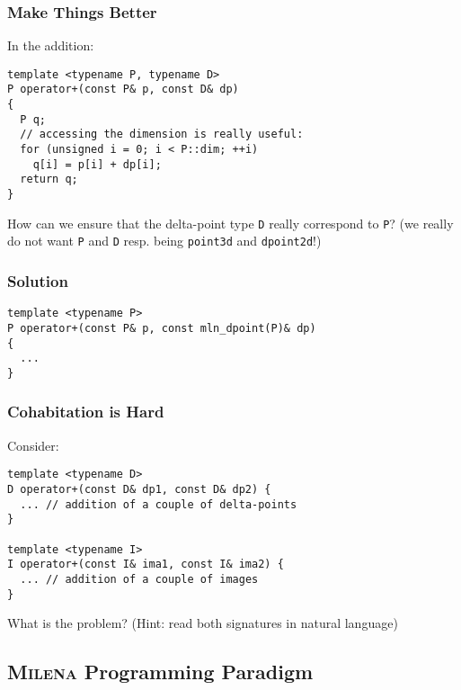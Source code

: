 \documentclass{beamer}
\newcommand{\code}[1]{{\scriptsize{\texttt{#1}}}\xspace}
\newcommand{\mln}{\textsc{Milena}\xspace}
\begin{document}
\begin{frame}[fragile]
  \frametitle{Make Things Better}

In the addition:

\begin{lstlisting}
template <typename P, typename D>
P operator+(const P& p, const D& dp)
{
  P q;
  // accessing the dimension is really useful:
  for (unsigned i = 0; i < P::dim; ++i)
    q[i] = p[i] + dp[i];
  return q;
}
\end{lstlisting}

How can we ensure that the delta-point type \code{D} really correspond
to \code{P}?  {\scriptsize (we really do not want \code{P} and
  \code{D} resp. being \code{point3d} and \code{dpoint2d}!)}

\end{frame}


\begin{frame}[fragile]
  \frametitle{Solution}

\begin{lstlisting}
template <typename P>
P operator+(const P& p, const mln_dpoint(P)& dp)
{
  ...
}
\end{lstlisting}

\end{frame}



\begin{frame}[fragile]
  \frametitle{Cohabitation is Hard}

Consider:

\begin{lstlisting}
template <typename D>
D operator+(const D& dp1, const D& dp2) {
  ... // addition of a couple of delta-points
}

template <typename I>
I operator+(const I& ima1, const I& ima2) {
  ... // addition of a couple of images
}
\end{lstlisting}

What is the problem?  (Hint: read both signatures in natural language)

\end{frame}



\subsection{\mln Programming Paradigm}
\end{document}
